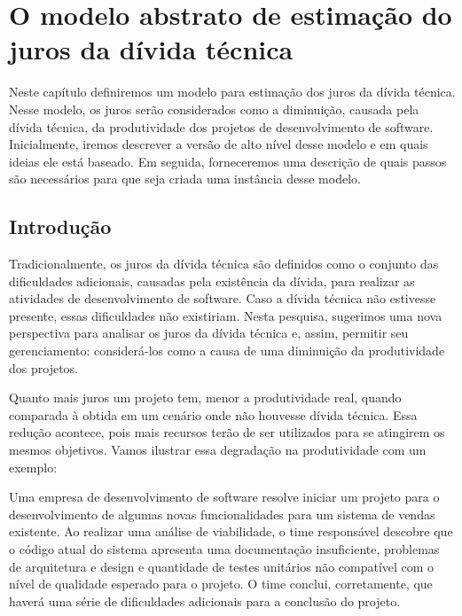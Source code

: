 \chapter{O modelo abstrato de estimação do juros da dívida técnica}
\label{estimacao:juros}

Neste capítulo definiremos um modelo para estimação dos juros da dívida técnica. Nesse modelo, os juros serão considerados como a diminuição, causada pela dívida técnica, da produtividade dos projetos de desenvolvimento de software. Inicialmente, iremos descrever a versão de alto nível desse modelo e em quais ideias ele está baseado. Em seguida, forneceremos uma descrição de quais passos são necessários para que seja criada uma instância desse modelo. 



\section{Introdução}



Tradicionalmente, os juros da dívida técnica são definidos como o conjunto das dificuldades adicionais, causadas pela existência da dívida, para realizar as atividades de desenvolvimento de software. Caso a dívida técnica não estivesse presente, essas dificuldades não existiriam. Nesta pesquisa, sugerimos uma nova perspectiva para analisar os juros da dívida técnica e, assim, permitir seu gerenciamento: considerá-los como a causa de uma diminuição da produtividade dos projetos. 

Quanto mais juros um projeto tem, menor a produtividade real, quando comparada à obtida em um cenário onde não houvesse dívida técnica. Essa redução acontece, pois mais recursos terão de ser utilizados para se atingirem os mesmos objetivos. Vamos ilustrar essa  degradação na produtividade com um exemplo: 

\begin{tcolorbox}
Uma empresa de desenvolvimento de software resolve iniciar um projeto para o desenvolvimento de algumas novas funcionalidades para um sistema de vendas existente. Ao realizar uma análise de viabilidade, o time responsável descobre que o código atual do sistema apresenta uma documentação insuficiente, problemas de arquitetura e design e quantidade de testes unitários não compatível com o nível de qualidade esperado para o projeto. O time conclui, corretamente, que haverá uma série de dificuldades adicionais para a conclusão do projeto. 
\end{tcolorbox}

